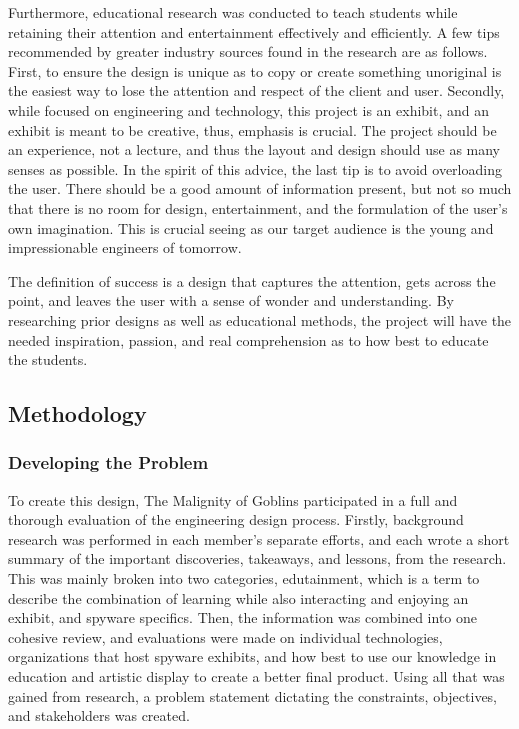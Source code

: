 \documentclass[conference]{IEEEtran}
\begin{document}
\par Furthermore, educational research was conducted to teach students while retaining their attention and entertainment effectively and efficiently. A few tips recommended by greater industry sources found in the research are as follows. First, to ensure the design is unique as to copy or create something unoriginal is the easiest way to lose the attention and respect of the client and user. Secondly, while focused on engineering and technology, this project is an exhibit, and an exhibit is meant to be creative, thus, emphasis is crucial. The project should be an experience, not a lecture, and thus the layout and design should use as many senses as possible. In the spirit of this advice, the last tip is to avoid overloading the user. There should be a good amount of information present, but not so much that there is no room for design, entertainment, and the formulation of the user’s own imagination. This is crucial seeing as our target audience is the young and impressionable engineers of tomorrow. 
\par The definition of success is a design that captures the attention, gets across the point, and leaves the user with a sense of wonder and understanding. By researching prior designs as well as educational methods, the project will have the needed inspiration, passion, and real comprehension as to how best to educate the students.  

\subsection{Methodology}

\subsubsection{Developing the Problem}

\par To create this design, The Malignity of Goblins participated in a full and thorough evaluation of the engineering design process. Firstly, background research was performed in each member’s separate efforts, and each wrote a short summary of the important discoveries, takeaways, and lessons, from the research. This was mainly broken into two categories, edutainment, which is a term to describe the combination of learning while also interacting and enjoying an exhibit, and spyware specifics. Then, the information was combined into one cohesive review, and evaluations were made on individual technologies, organizations that host spyware exhibits, and how best to use our knowledge in education and artistic display to create a better final product. Using all that was gained from research, a problem statement dictating the constraints, objectives, and stakeholders was created. 
\end{document}
